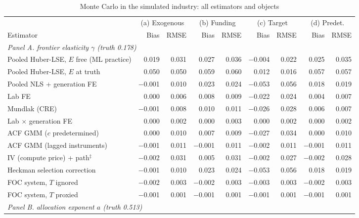 \begin{table}[!htbp]
\centering
\begin{threeparttable}
\caption{Monte Carlo in the simulated industry: all estimators and objects}
\label{tab:mc_industry_full}
\footnotesize
\begin{tabular}{lrrrrrrrr}
\toprule
 & \multicolumn{2}{c}{(a) Exogenous} & \multicolumn{2}{c}{(b) Funding} & \multicolumn{2}{c}{(c) Target} & \multicolumn{2}{c}{(d) Predet.} \\
\cmidrule(lr){2-3} \cmidrule(lr){4-5} \cmidrule(lr){6-7} \cmidrule(lr){8-9}
Estimator & Bias & RMSE & Bias & RMSE & Bias & RMSE & Bias & RMSE \\
\midrule
\multicolumn{9}{l}{\textit{Panel A. frontier elasticity $\gamma$ (truth 0.178)}} \\
Pooled Huber-LSE, $E$ free (ML practice) & 0.019 & 0.031 & 0.027 & 0.036 & $-$0.004 & 0.022 & 0.025 & 0.035 \\
Pooled Huber-LSE, $E$ at truth & 0.050 & 0.050 & 0.059 & 0.060 & 0.012 & 0.016 & 0.057 & 0.057 \\
Pooled NLS + generation FE & $-$0.001 & 0.010 & 0.023 & 0.024 & $-$0.053 & 0.056 & 0.018 & 0.019 \\
Lab FE & 0.000 & 0.006 & 0.008 & 0.009 & $-$0.022 & 0.024 & 0.004 & 0.007 \\
Mundlak (CRE) & $-$0.001 & 0.008 & 0.010 & 0.011 & $-$0.026 & 0.028 & 0.006 & 0.007 \\
Lab $\times$ generation FE & 0.000 & 0.002 & 0.000 & 0.003 & 0.000 & 0.002 & 0.000 & 0.002 \\
ACF GMM ($c$ predetermined) & 0.000 & 0.010 & 0.007 & 0.009 & $-$0.027 & 0.034 & 0.000 & 0.010 \\
ACF GMM (lagged instruments) & $-$0.001 & 0.011 & $-$0.001 & 0.011 & $-$0.002 & 0.011 & $-$0.001 & 0.011 \\
IV (compute price) + path$^{\ddagger}$ & $-$0.002 & 0.031 & 0.005 & 0.031 & $-$0.002 & 0.027 & $-$0.002 & 0.028 \\
Heckman selection correction & $-$0.001 & 0.010 & 0.023 & 0.024 & $-$0.053 & 0.056 & 0.018 & 0.019 \\
FOC system, $T$ ignored & $-$0.002 & 0.003 & $-$0.002 & 0.003 & $-$0.003 & 0.003 & $-$0.002 & 0.003 \\
FOC system, $T$ proxied & $-$0.001 & 0.001 & $-$0.001 & 0.001 & $-$0.001 & 0.001 & $-$0.001 & 0.001 \\
\midrule
\multicolumn{9}{l}{\textit{Panel B. allocation exponent $a$ (truth 0.513)}} \\

\end{tabular}
\end{threeparttable}
\end{table}
